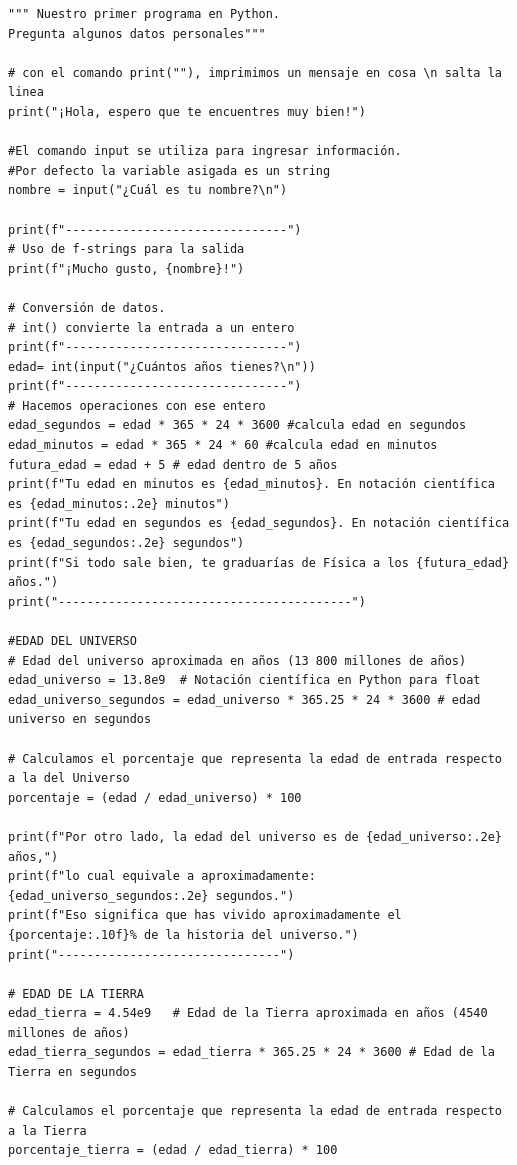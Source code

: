 \documentclass[12pt]{article}
\begin{document}
%
\begin{lstlisting}[captionpos=t, title=\texttt{primer\_programa.py}]
""" Nuestro primer programa en Python. 
Pregunta algunos datos personales"""

# con el comando print(""), imprimimos un mensaje en cosa \n salta la linea
print("¡Hola, espero que te encuentres muy bien!")

#El comando input se utiliza para ingresar información. 
#Por defecto la variable asigada es un string
nombre = input("¿Cuál es tu nombre?\n")

print(f"-------------------------------")
# Uso de f-strings para la salida
print(f"¡Mucho gusto, {nombre}!")

# Conversión de datos. 
# int() convierte la entrada a un entero
print(f"-------------------------------")
edad= int(input("¿Cuántos años tienes?\n"))
print(f"-------------------------------")
# Hacemos operaciones con ese entero 
edad_segundos = edad * 365 * 24 * 3600 #calcula edad en segundos
edad_minutos = edad * 365 * 24 * 60 #calcula edad en minutos
futura_edad = edad + 5 # edad dentro de 5 años
print(f"Tu edad en minutos es {edad_minutos}. En notación científica es {edad_minutos:.2e} minutos")
print(f"Tu edad en segundos es {edad_segundos}. En notación científica es {edad_segundos:.2e} segundos")
print(f"Si todo sale bien, te graduarías de Física a los {futura_edad} años.")
print("-----------------------------------------")

#EDAD DEL UNIVERSO
# Edad del universo aproximada en años (13 800 millones de años)
edad_universo = 13.8e9  # Notación científica en Python para float
edad_universo_segundos = edad_universo * 365.25 * 24 * 3600 # edad universo en segundos

# Calculamos el porcentaje que representa la edad de entrada respecto a la del Universo
porcentaje = (edad / edad_universo) * 100

print(f"Por otro lado, la edad del universo es de {edad_universo:.2e} años,")
print(f"lo cual equivale a aproximadamente: {edad_universo_segundos:.2e} segundos.")
print(f"Eso significa que has vivido aproximadamente el {porcentaje:.10f}% de la historia del universo.")
print("-------------------------------")

# EDAD DE LA TIERRA
edad_tierra = 4.54e9   # Edad de la Tierra aproximada en años (4540 millones de años)
edad_tierra_segundos = edad_tierra * 365.25 * 24 * 3600 # Edad de la Tierra en segundos

# Calculamos el porcentaje que representa la edad de entrada respecto a la Tierra
porcentaje_tierra = (edad / edad_tierra) * 100


\end{lstlisting}
\end{document}
